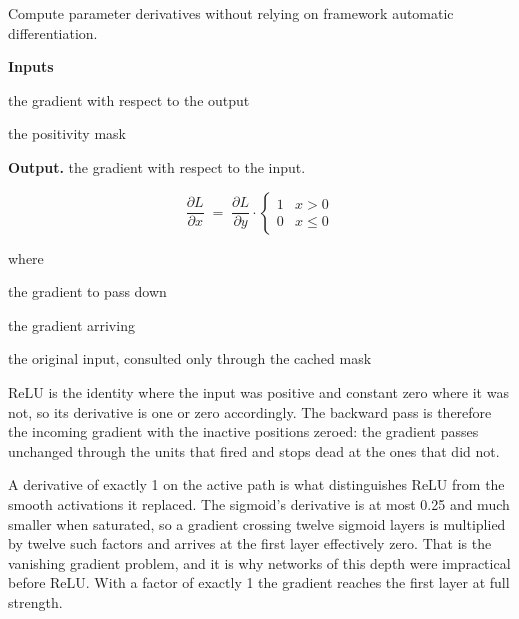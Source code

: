 Compute parameter derivatives without relying on framework automatic differentiation.




\noindent\textbf{Inputs}
\begin{description}[leftmargin=2.2em,style=nextline,font=\normalfont\ttfamily]\setlength\itemsep{1pt}
  \item[{dout}] \normalfont the gradient with respect to the output
  \item[{cache}] \normalfont the positivity mask
\end{description}

\noindent\textbf{Output.} the gradient with respect to the input.



\begin{equation}
\frac{\partial L}{\partial x} \;=\; \frac{\partial L}{\partial y} \cdot \begin{cases} 1 & x > 0 \\ 0 & x \le 0 \end{cases}
\end{equation}

\noindent where
\begin{description}[leftmargin=2.4em,style=nextline,font=\normalfont\ttfamily]\setlength\itemsep{1pt}
  \item[{$\frac{\partial L}{\partial x}$}] \normalfont the gradient to pass down
  \item[{$\frac{\partial L}{\partial y}$}] \normalfont the gradient arriving
  \item[{$x$}] \normalfont the original input, consulted only through the cached mask
\end{description}
ReLU is the identity where the input was positive and constant zero where it was not, so its derivative is one or zero accordingly. The backward pass is therefore the incoming gradient with the inactive positions zeroed: the gradient passes unchanged through the units that fired and stops dead at the ones that did not.


A derivative of exactly 1 on the active path is what distinguishes ReLU from the smooth activations it replaced. The sigmoid's derivative is at most 0.25 and much smaller when saturated, so a gradient crossing twelve sigmoid layers is multiplied by twelve such factors and arrives at the first layer effectively zero. That is the vanishing gradient problem, and it is why networks of this depth were impractical before ReLU. With a factor of exactly 1 the gradient reaches the first layer at full strength.


